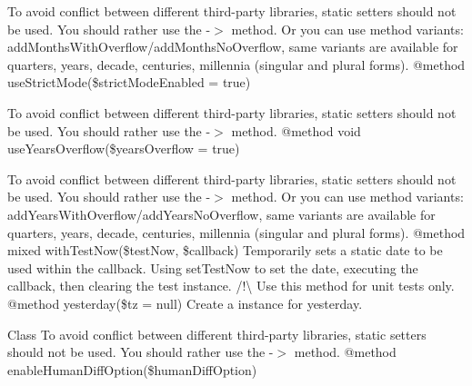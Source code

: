 \begin{DoxyRefList}
To avoid conflict between different third-\/party libraries, static setters should not be used. You should rather use the -\/\texorpdfstring{$>$}{>} method. Or you can use method variants\+: add\+Months\+With\+Overflow/add\+Months\+No\+Overflow, same variants are available for quarters, years, decade, centuries, millennia (singular and plural forms). @method  use\+Strict\+Mode(\$strict\+Mode\+Enabled = true) 



To avoid conflict between different third-\/party libraries, static setters should not be used. You should rather use the -\/\texorpdfstring{$>$}{>} method. @method void use\+Years\+Overflow(\$years\+Overflow = true) 



To avoid conflict between different third-\/party libraries, static setters should not be used. You should rather use the -\/\texorpdfstring{$>$}{>} method. Or you can use method variants\+: add\+Years\+With\+Overflow/add\+Years\+No\+Overflow, same variants are available for quarters, years, decade, centuries, millennia (singular and plural forms). @method mixed with\+Test\+Now(\$test\+Now, \$callback) Temporarily sets a static date to be used within the callback. Using set\+Test\+Now to set the date, executing the callback, then clearing the test instance. /!\textbackslash{} Use this method for unit tests only. @method  yesterday(\$tz = null) Create a  instance for yesterday. 
\item[Class \doxylink{class_carbon_1_1_factory_immutable}{Factory\+Immutable} ]\label{deprecated__deprecated000123}%
%
To avoid conflict between different third-\/party libraries, static setters should not be used. You should rather use the -\/\texorpdfstring{$>$}{>} method. @method  enable\+Human\+Diff\+Option(\$human\+Diff\+Option) 




\end{DoxyRefList}

